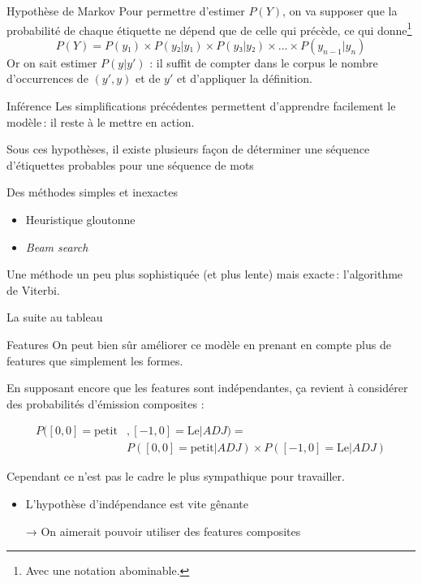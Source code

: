 \documentclass[../allslides.tex]{subfiles}
\begin{document}

\begin{frame}{Hypothèse de Markov}
	Pour permettre d'estimer $P(Y)$, on va supposer que la probabilité de chaque étiquette ne dépend que de celle qui précède, ce qui donne\footnote{Avec une notation abominable.}
	\begin{equation}
		P(Y) = P(y₁)×P(y₂|y₁)×P(y₃|y₂)×…×P(y_{n-1}|y_n)
	\end{equation}
	Or on sait estimer $P(y|y')$ : il suffit de compter dans le corpus le nombre d'occurrences de $(y',y)$ et de $y'$ et d'appliquer la définition.
\end{frame}

\begin{frame}{Inférence}
	Les simplifications précédentes permettent d'apprendre facilement le modèle : il reste à le mettre en action.

	Sous ces hypothèses, il existe plusieurs façon de déterminer une séquence d'étiquettes probables pour une séquence de mots

	Des méthodes simples et inexactes
	\begin{itemize}
		\item Heuristique gloutonne
		\item \emph{Beam search}
	\end{itemize}

	Une méthode un peu plus sophistiquée (et plus lente) mais exacte : l'algorithme de Viterbi.
\end{frame}


\begin{frame}[standout]
	La suite au tableau
\end{frame}

\begin{frame}{Features}
	On peut bien sûr améliorer ce modèle en prenant en compte plus de features que simplement les formes.

	En supposant encore que les features sont indépendantes, ça revient à considérer des probabilités d'émission composites :

	\begin{equation}
		\begin{split}
			P([0,0]{=}\text{petit}&, [-1,0]{=}\text{Le}|ADJ) =\\
				& P([0,0]{=}\text{petit}|ADJ) × P([-1,0]{=}\text{Le}|ADJ)
		\end{split}
	\end{equation}

	Cependant ce n'est pas le cadre le plus sympathique pour travailler.
	\begin{itemize}
		\item L'hypothèse d'indépendance est vite gênante
		\item[→] On aimerait pouvoir utiliser des features composites
	\end{itemize}
\end{frame}
\end{document}
